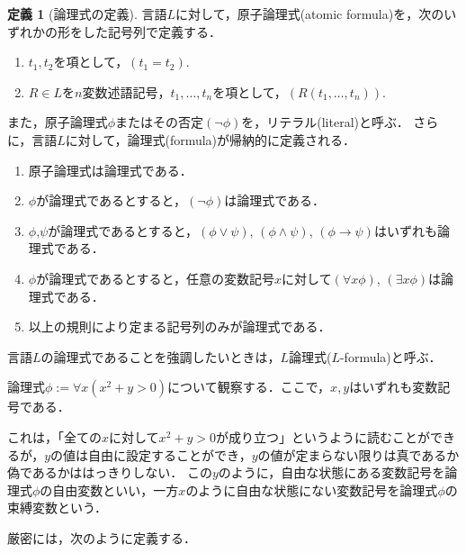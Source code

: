 \documentclass[uplatex, dvipdfmx]{jsarticle}
\theoremstyle{definition}
\newtheorem{definition}{定義}[section]
\begin{document}
\begin{definition}[論理式の定義]
     言語$L$に対して，原子論理式(atomic formula)を，次のいずれかの形をした記号列で定義する．
     \begin{enumerate}
          \item $t_1, t_2$を項として，$(t_1=t_2)$.
          \item $R \in L$を$n$変数述語記号，$t_1, \dots, t_n$を項として，$(R(t_1, \dots, t_n))$.
     \end{enumerate}
     
     また，原子論理式$\phi$またはその否定$(\lnot \phi)$を，リテラル(literal)と呼ぶ．
     さらに，言語$L$に対して，論理式(formula)が帰納的に定義される．
     \begin{enumerate}
          \item 原子論理式は論理式である．
          \item $\phi$が論理式であるとすると，$(\lnot \phi)$は論理式である．
          \item $\phi$,$\psi$が論理式であるとすると，$(\phi \lor \psi)$, $(\phi \land \psi)$, $(\phi \rightarrow \psi)$はいずれも論理式である．
          \item $\phi$が論理式であるとすると，任意の変数記号$x$に対して$(\forall x \phi)$, $(\exists x \phi)$は論理式である．
          \item 以上の規則により定まる記号列のみが論理式である．
     \end{enumerate}
     言語$L$の論理式であることを強調したいときは，$L$論理式($L$-formula)と呼ぶ．
\end{definition}

論理式$\phi := \forall x (x^2 + y > 0)$について観察する．ここで，$x,y$はいずれも変数記号である．

これは，「全ての$x$に対して$x^2 + y > 0$が成り立つ」というように読むことができるが，$y$の値は自由に設定することができ，$y$の値が定まらない限りは真であるか偽であるかははっきりしない．
この$y$のように，自由な状態にある変数記号を論理式$\phi$の自由変数といい，一方$x$のように自由な状態にない変数記号を論理式$\phi$の束縛変数という．

厳密には，次のように定義する．
\end{document}
